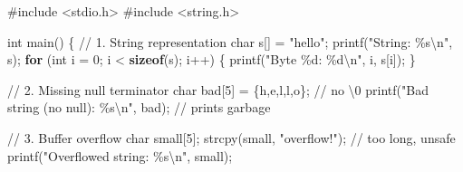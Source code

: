 \documentclass[
  letterpaper,
  DIV=11,
  numbers=noendperiod]{scrreprt}
\newenvironment{Shaded}{\begin{snugshade}}{\end{snugshade}}
\newcommand{\CharTok}[1]{\textcolor[rgb]{0.13,0.47,0.30}{#1}}
\newcommand{\CommentTok}[1]{\textcolor[rgb]{0.37,0.37,0.37}{#1}}
\newcommand{\ControlFlowTok}[1]{\textcolor[rgb]{0.00,0.23,0.31}{\textbf{#1}}}
\newcommand{\DataTypeTok}[1]{\textcolor[rgb]{0.68,0.00,0.00}{#1}}
\newcommand{\DecValTok}[1]{\textcolor[rgb]{0.68,0.00,0.00}{#1}}
\newcommand{\ImportTok}[1]{\textcolor[rgb]{0.00,0.46,0.62}{#1}}
\newcommand{\KeywordTok}[1]{\textcolor[rgb]{0.00,0.23,0.31}{\textbf{#1}}}
\newcommand{\NormalTok}[1]{\textcolor[rgb]{0.00,0.23,0.31}{#1}}
\newcommand{\OperatorTok}[1]{\textcolor[rgb]{0.37,0.37,0.37}{#1}}
\newcommand{\PreprocessorTok}[1]{\textcolor[rgb]{0.68,0.00,0.00}{#1}}
\newcommand{\SpecialCharTok}[1]{\textcolor[rgb]{0.37,0.37,0.37}{#1}}
\newcommand{\StringTok}[1]{\textcolor[rgb]{0.13,0.47,0.30}{#1}}
\begin{document}
\begin{Shaded}
\begin{Highlighting}[]
\PreprocessorTok{\#include }\ImportTok{\textless{}stdio.h\textgreater{}}
\PreprocessorTok{\#include }\ImportTok{\textless{}string.h\textgreater{}}

\DataTypeTok{int}\NormalTok{ main}\OperatorTok{()} \OperatorTok{\{}
    \CommentTok{// 1. String representation}
    \DataTypeTok{char}\NormalTok{ s}\OperatorTok{[]} \OperatorTok{=} \StringTok{"hello"}\OperatorTok{;}
\NormalTok{    printf}\OperatorTok{(}\StringTok{"String: }\SpecialCharTok{\%s\textbackslash{}n}\StringTok{"}\OperatorTok{,}\NormalTok{ s}\OperatorTok{);}
    \ControlFlowTok{for} \OperatorTok{(}\DataTypeTok{int}\NormalTok{ i }\OperatorTok{=} \DecValTok{0}\OperatorTok{;}\NormalTok{ i }\OperatorTok{\textless{}} \KeywordTok{sizeof}\OperatorTok{(}\NormalTok{s}\OperatorTok{);}\NormalTok{ i}\OperatorTok{++)} \OperatorTok{\{}
\NormalTok{        printf}\OperatorTok{(}\StringTok{"Byte }\SpecialCharTok{\%d}\StringTok{: }\SpecialCharTok{\%d\textbackslash{}n}\StringTok{"}\OperatorTok{,}\NormalTok{ i}\OperatorTok{,}\NormalTok{ s}\OperatorTok{[}\NormalTok{i}\OperatorTok{]);}
    \OperatorTok{\}}

    \CommentTok{// 2. Missing null terminator}
    \DataTypeTok{char}\NormalTok{ bad}\OperatorTok{[}\DecValTok{5}\OperatorTok{]} \OperatorTok{=} \OperatorTok{\{}\CharTok{\textquotesingle{}h\textquotesingle{}}\OperatorTok{,}\CharTok{\textquotesingle{}e\textquotesingle{}}\OperatorTok{,}\CharTok{\textquotesingle{}l\textquotesingle{}}\OperatorTok{,}\CharTok{\textquotesingle{}l\textquotesingle{}}\OperatorTok{,}\CharTok{\textquotesingle{}o\textquotesingle{}}\OperatorTok{\};} \CommentTok{// no \textquotesingle{}\textbackslash{}0\textquotesingle{}}
\NormalTok{    printf}\OperatorTok{(}\StringTok{"Bad string (no null): }\SpecialCharTok{\%s\textbackslash{}n}\StringTok{"}\OperatorTok{,}\NormalTok{ bad}\OperatorTok{);} \CommentTok{// prints garbage}

    \CommentTok{// 3. Buffer overflow}
    \DataTypeTok{char}\NormalTok{ small}\OperatorTok{[}\DecValTok{5}\OperatorTok{];}
\NormalTok{    strcpy}\OperatorTok{(}\NormalTok{small}\OperatorTok{,} \StringTok{"overflow!"}\OperatorTok{);} \CommentTok{// too long, unsafe}
\NormalTok{    printf}\OperatorTok{(}\StringTok{"Overflowed string: }\SpecialCharTok{\%s\textbackslash{}n}\StringTok{"}\OperatorTok{,}\NormalTok{ small}\OperatorTok{);}


\end{Highlighting}
\end{Shaded}
\end{document}
